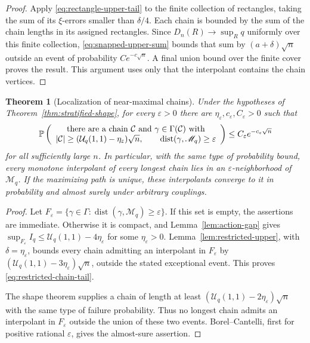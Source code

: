 \documentclass[11pt]{article}
\newtheorem{theorem}{Theorem}[section]
\theoremstyle{remark}
\newcommand{\Pp}{\mathbb P}
\newcommand{\eps}{\varepsilon}
\newcommand{\calU}{\mathcal U}
\newcommand{\dist}{\operatorname{dist}}
\begin{document}
\begin{proof}
Apply \eqref{eq:rectangle-upper-tail} to the finite collection of rectangles,
taking the sum of its $\xi$-errors smaller than $\delta/4$.  Each chain is
bounded by the sum of the chain lengths in its assigned rectangles.  Since
$D_n(R)\to\sup_Rq$ uniformly over this finite collection,
\eqref{eq:snapped-upper-sum} bounds that sum by $(a+\delta)\sqrt n$
outside an event of probability $Ce^{-c\sqrt n}$.  A final union bound over
the finite cover proves the result.  This argument uses only that the
interpolant contains the chain vertices.
\end{proof}

\begin{theorem}[Localization of near-maximal chains]
\label{thm:localization}
Under the hypotheses of Theorem~\ref{thm:stratified-shape}, for every
$\eps>0$ there are $\eta_\eps,c_\eps,C_\eps>0$ such that
\begin{equation}\label{eq:restricted-chain-tail}
 \Pp\left(
 \begin{array}{c}
 \text{there are a chain }\mathcal C
     \text{ and }\gamma\in\Gamma(\mathcal C)\text{ with}\cr
 |\mathcal C|\ge(\calU_q(1,1)-\eta_\eps)\sqrt n,
 \qquad\dist(\gamma,\mathscr M_q)\ge\eps
 \end{array}
 \right)
 \le C_\eps e^{-c_\eps\sqrt n}
\end{equation}
for all sufficiently large $n$.  In particular, with the same type of
probability bound, every monotone interpolant of every longest chain lies
in an $\eps$-neighborhood of $\mathscr M_q$.  If the maximizing path is
unique, these interpolants converge to it in probability and almost surely
under arbitrary couplings.
\end{theorem}

\begin{proof}
Let $F_\eps=\{\gamma\in\Gamma:
\dist(\gamma,\mathscr M_q)\ge\eps\}$.  If this set is empty, the assertions
are immediate.  Otherwise it is compact, and Lemma~\ref{lem:action-gap}
gives $\sup_{F_\eps}I_q\le\calU_q(1,1)-4\eta_\eps$ for some
$\eta_\eps>0$.  Lemma~\ref{lem:restricted-upper}, with
$\delta=\eta_\eps$, bounds every chain admitting an interpolant in
$F_\eps$ by $(\calU_q(1,1)-3\eta_\eps)\sqrt n$, outside the stated
exceptional event.  This proves \eqref{eq:restricted-chain-tail}.

The shape theorem supplies a chain of length at least
$(\calU_q(1,1)-2\eta_\eps)\sqrt n$ with the same type of failure
probability.  Thus no longest chain admits an interpolant in $F_\eps$
outside the union of these two events.  Borel--Cantelli, first for positive
rational $\eps$, gives the almost-sure assertion.
\end{proof}
\end{document}
